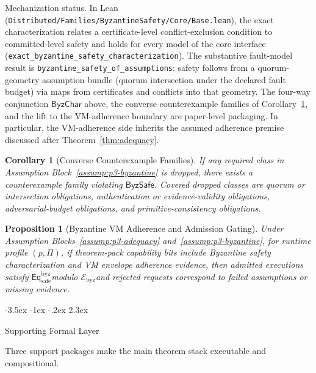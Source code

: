 \documentclass[a4paper,10pt,twocolumn,english]{article}
\makeatletter
\renewcommand{\section}{\@startsection{section}{1}{\z@}%
  {-3.5ex \@plus -1ex \@minus -.2ex}%
  {2.3ex}%
  {\raggedright\normalfont\large\bfseries}}
\numberwithin{equation}{section}
\theoremstyle{paperdef}
\theoremstyle{paperplain}
\newtheorem{proposition}[definition]{Proposition}
\newtheorem{corollary}[definition]{Corollary}
\theoremstyle{paperdef}
\theoremstyle{paperremark}
\theoremstyle{paperdef}
\newcommand{\Eqsafe}{\ensuremath{\mathsf{Eq}_{\mathrm{safe}}^{\mathrm{byz}}}}
\newcommand{\Ebyz}{\ensuremath{\mathcal{E}_{\mathrm{byz}}}}
\newcommand{\ByzSafe}{\ensuremath{\mathsf{ByzSafe}}}
\newcommand{\ByzChar}{\ensuremath{\mathsf{ByzChar}}}
\makeatother
\begin{document}
Mechanization status. In Lean
(\texttt{Distributed/\allowbreak Families/\allowbreak ByzantineSafety/\allowbreak Core/\allowbreak Base.lean}),
the exact characterization relates a certificate-level conflict-exclusion
condition to committed-level safety and holds for every model of the core
interface (\nolinkurl{exact_byzantine_safety_characterization}). The substantive
fault-model result is \nolinkurl{byzantine_safety_of_assumptions}: safety
follows from a quorum-geometry assumption bundle (quorum intersection under the
declared fault budget) via maps from certificates and conflicts into that
geometry. The four-way conjunction $\ByzChar$ above, the converse counterexample
families of Corollary~\ref{cor:byzantine-converse}, and the lift to the
VM-adherence boundary are paper-level packaging. In particular, the
VM-adherence side inherits the assumed adherence premise discussed after
Theorem~\ref{thm:adequacy}.

\begin{corollary}[Converse Counterexample Families]
	\label{cor:byzantine-converse}
	If any required class in Assumption Block~\ref{assump:p3-byzantine} is dropped, there exists a counterexample family violating \ByzSafe. Covered dropped classes are quorum or intersection obligations, authentication or evidence-validity obligations, adversarial-budget obligations, and primitive-consistency obligations.
\end{corollary}

\begin{proposition}[Byzantine VM Adherence and Admission Gating]
	\label{prop:byzantine-vm}
	Under Assumption Blocks~\ref{assump:p3-adequacy} and~\ref{assump:p3-byzantine}, for runtime profile $(p,\Pi)$, if theorem-pack capability bits include Byzantine safety characterization and VM envelope adherence evidence, then admitted executions satisfy \Eqsafe modulo \Ebyz and rejected requests correspond to failed assumptions or missing evidence.
\end{proposition}

\section{Supporting Formal Layer}
\label{sec:supporting}

Three support packages make the main theorem stack executable and compositional.
\end{document}
